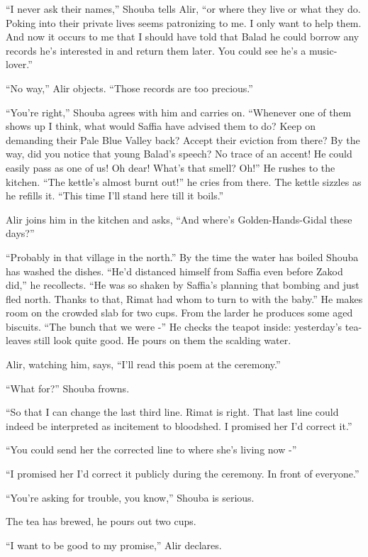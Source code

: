 \documentclass[twoside,11pt]{book}
\begin{document}
``I never ask their names,'' Shouba tells Alir, ``or where they live or what they do. Poking into their
private lives seems patronizing to me. I only want to help them.  And now it occurs to me that I should have told that
Balad he could borrow any records he's interested in and return them later. You could see he's a
music-lover.''

``No way,'' Alir objects. ``Those records are too precious.''

``You're right,'' Shouba agrees with him and carries on. ``Whenever one of them
shows up I think, what would Saffia have advised them to do? Keep on demanding their Pale Blue Valley back? Accept
their eviction from there? By the way, did you notice that young Balad's speech? No trace of an accent! He could easily
pass as one of us! Oh dear! What's that smell? Oh!'' He rushes to the kitchen. ``The kettle's
almost burnt out!'' he cries from there. The kettle sizzles as he refills it. ``This time
I'll stand here till it boils.''

Alir joins him in the kitchen and asks, ``And where's Golden-Hands-Gidal these days?''

``Probably in that village in the north.'' By the time the water has boiled Shouba has washed
the dishes. ``He'd distanced himself from Saffia even before Zakod did,'' he recollects.
``He was so shaken by Saffia's planning that bombing and just fled north. Thanks to that, Rimat had whom
to turn to with the baby.'' He makes room on the crowded slab for two cups. From the larder he produces
some aged biscuits. ``The bunch that we were -'' He checks the teapot inside: yesterday's
tea-leaves still look quite good.  He pours on them the scalding water.

Alir, watching him, says, ``I'll read this poem at the ceremony.''

``What for?'' Shouba frowns. \

``So that I can change the last third line. Rimat is right. That last line could indeed be interpreted as
incitement to bloodshed. I promised her I'd correct it.''

``You could send her the corrected line to where she's living now -''

``I promised her I'd correct it publicly during the ceremony. In front of everyone.''

``You're asking for trouble, you know,'' Shouba is serious.

The tea has brewed, he pours out two cups.

``I want to be good to my promise,'' Alir declares.
\end{document}
